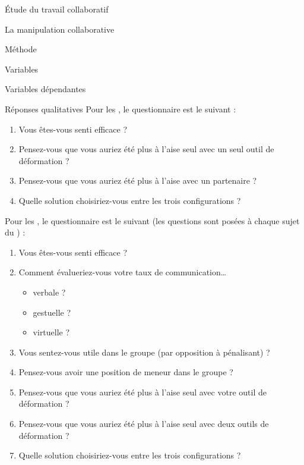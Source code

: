 \documentclass[myfrancais]{mythesis}
\begin{document}
\begin{mypart}{Étude du travail collaboratif}
\begin{mychapter}{La manipulation collaborative}
\begin{mysection}{Méthode}
\begin{mysubsection}{Variables}
\begin{mysubsubsection}{Variables dépendantes}
\begin{myparagraph}{ Réponses qualitatives}
							Pour les , le questionnaire est le suivant :
							\begin{enumerate}
								\item Vous êtes-vous senti efficace ?
								\item Pensez-vous que vous auriez été plus à l'aise seul avec un seul outil de déformation ?
								\item Pensez-vous que vous auriez été plus à l'aise avec un partenaire ?
								\item Quelle solution choisiriez-vous entre les trois configurations ?
							\end{enumerate}

							Pour les , le questionnaire est le suivant (les questions sont posées à chaque sujet du ) :
							\begin{enumerate}
								\item Vous êtes-vous senti efficace ?
								\item Comment évalueriez-vous votre taux de communication\dots{}
									\begin{itemize}
										\item verbale ?
										\item gestuelle ?
										\item virtuelle ?
									\end{itemize}
								\item Vous sentez-vous utile dans le groupe (par opposition à pénalisant) ?
								\item Pensez-vous avoir une position de meneur dans le groupe ?
								\item Pensez-vous que vous auriez été plus à l'aise seul avec votre outil de déformation ?
								\item Pensez-vous que vous auriez été plus à l'aise seul avec deux outils de déformation ?
								\item Quelle solution choisiriez-vous entre les trois configurations ?
							\end{enumerate}


\end{myparagraph}
\end{mysubsubsection}
\end{mysubsection}
\end{mysection}
\end{mychapter}
\end{mypart}
\end{document}
